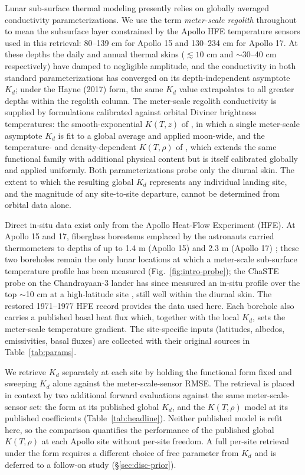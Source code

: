 \documentclass[11pt]{article}
\begin{document}
Lunar sub-surface thermal modeling presently relies on globally averaged
conductivity parameterizations. We use the term
\emph{meter-scale regolith} throughout to mean
the subsurface layer constrained by the
Apollo HFE temperature sensors used in this retrieval:
80--139 cm for Apollo 15 and 130--234 cm for Apollo 17. At these depths the
daily and annual thermal skins ($\lesssim 10$ cm and $\sim$30--40 cm
respectively) have damped to negligible amplitude, and the conductivity in
both standard parameterizations has
converged on its depth-independent asymptote
$K_d$; under the Hayne (2017) form, the same $K_d$ value
extrapolates to all greater depths within the regolith column. The meter-scale regolith conductivity is supplied by formulations
calibrated against orbital Diviner brightness temperatures: the
smooth-exponential $K(T,z)$ of \citet{hayne2017}, in which a single
meter-scale asymptote $K_d$ is fit to a global
average and applied moon-wide, and the temperature- and density-dependent
$K(T,\rho)$ of \citet{martinez2021}, which extends the same functional
family with additional physical content but is itself calibrated globally
and applied uniformly. Both parameterizations probe only the diurnal skin.
The extent to which the resulting global $K_d$ represents any individual
landing site, and the magnitude of any site-to-site departure, cannot be
determined from orbital data alone.

Direct in-situ data exist only from the Apollo Heat-Flow Experiment (HFE).
At Apollo 15 and 17, fiberglass borestems emplaced by the astronauts
carried thermometers to depths of up to 1.4 m (Apollo 15) and 2.3 m
(Apollo 17) \citep{langseth1972,langseth1976}; these two boreholes remain the only
lunar locations at which a meter-scale sub-surface temperature profile
has been measured (Fig.~\ref{fig:intro-probe}); the ChaSTE probe on the
Chandrayaan-3 lander has since measured an in-situ profile over the top
$\sim$10 cm at a high-latitude site \citep{mathew2025chaste}, still
well within the diurnal skin. The restored 1971--1977 HFE record
\citep{nagihara2018} provides the data used here. Each borehole also
carries a published basal heat flux \citep{langseth1976,nagihara2018}
which, together with the local $K_d$, sets the
meter-scale temperature gradient. The site-specific inputs
(latitudes, albedos, emissivities, basal fluxes) are collected with their
original sources in Table~\ref{tab:params}.

We retrieve $K_d$ separately at each site by holding the \citet{hayne2017}
functional form fixed and sweeping $K_d$ alone against the
meter-scale-sensor RMSE. The retrieval is placed in
context by two additional forward evaluations against the same
meter-scale-sensor set: the \citet{hayne2017} form
at its published global $K_d$, and the \citet{martinez2021} $K(T,\rho)$
model at its published coefficients (Table~\ref{tab:headline}). Neither
published model is refit here, so the \citet{martinez2021} comparison
quantifies the performance of the published global $K(T,\rho)$ at each
Apollo site without per-site freedom. A full per-site retrieval under the
\citet{martinez2021} form requires a different choice of free parameter from
$K_d$ and is deferred to a follow-on study (\S\ref{sec:disc-prior}).
\end{document}
